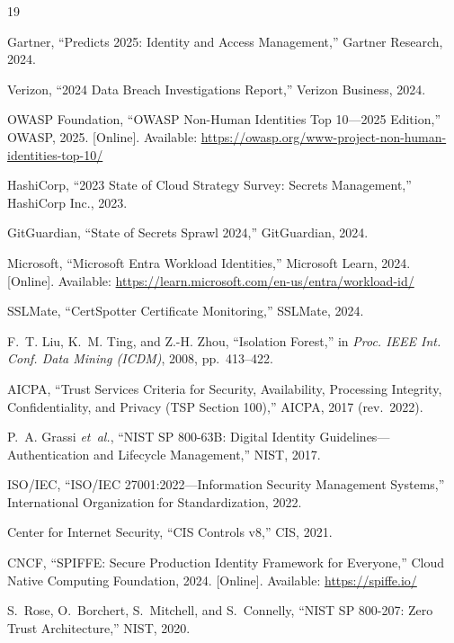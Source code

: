 \documentclass[journal]{IEEEtran}
\begin{document}

\begin{thebibliography}{19}

Gartner, ``Predicts 2025: Identity and Access Management,'' Gartner Research, 2024.

Verizon, ``2024 Data Breach Investigations Report,'' Verizon Business, 2024.

OWASP Foundation, ``OWASP Non-Human Identities Top 10---2025 Edition,'' OWASP, 2025. [Online]. Available: \url{https://owasp.org/www-project-non-human-identities-top-10/}

HashiCorp, ``2023 State of Cloud Strategy Survey: Secrets Management,'' HashiCorp Inc., 2023.

GitGuardian, ``State of Secrets Sprawl 2024,'' GitGuardian, 2024.

Microsoft, ``Microsoft Entra Workload Identities,'' Microsoft Learn, 2024. [Online]. Available: \url{https://learn.microsoft.com/en-us/entra/workload-id/}

SSLMate, ``CertSpotter Certificate Monitoring,'' SSLMate, 2024.

F.~T. Liu, K.~M. Ting, and Z.-H. Zhou, ``Isolation Forest,'' in \emph{Proc. IEEE Int. Conf. Data Mining (ICDM)}, 2008, pp.~413--422.

AICPA, ``Trust Services Criteria for Security, Availability, Processing Integrity, Confidentiality, and Privacy (TSP Section 100),'' AICPA, 2017 (rev.\ 2022).

P.~A. Grassi \emph{et~al.}, ``NIST SP 800-63B: Digital Identity Guidelines---Authentication and Lifecycle Management,'' NIST, 2017.

ISO/IEC, ``ISO/IEC 27001:2022---Information Security Management Systems,'' International Organization for Standardization, 2022.

Center for Internet Security, ``CIS Controls v8,'' CIS, 2021.

CNCF, ``SPIFFE: Secure Production Identity Framework for Everyone,'' Cloud Native Computing Foundation, 2024. [Online]. Available: \url{https://spiffe.io/}

S.~Rose, O.~Borchert, S.~Mitchell, and S.~Connelly, ``NIST SP 800-207: Zero Trust Architecture,'' NIST, 2020.


\end{thebibliography}
\end{document}
